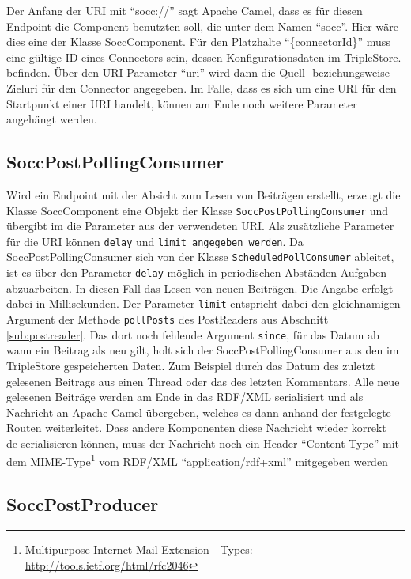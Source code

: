 Der Anfang der URI mit \enquote{socc://} sagt Apache Camel, dass es für diesen Endpoint die Component benutzten soll, die unter dem Namen \enquote{socc}. Hier wäre dies eine der Klasse SoccComponent. Für den Platzhalte \enquote{\{connectorId\}} muss eine gültige ID eines Connectors sein, dessen Konfigurationsdaten im TripleStore. befinden. Über den URI Parameter \enquote{uri} wird dann die Quell- beziehungsweise Zieluri für den Connector angegeben. Im Falle, dass es sich um eine URI für den Startpunkt einer URI handelt, können am Ende noch weitere Parameter angehängt werden.

\subsection{SoccPostPollingConsumer} %
\label{sub:soccpostpollingconsumer}

Wird ein Endpoint mit der Absicht zum Lesen von Beiträgen erstellt, erzeugt die Klasse SoccComponent eine Objekt der Klasse \texttt{SoccPostPollingConsumer} und übergibt im die Parameter aus der verwendeten URI. Als zusätzliche Parameter für die URI können \texttt{delay} und \texttt{limit angegeben werden}. Da SoccPostPollingConsumer sich von der Klasse \texttt{ScheduledPollConsumer} ableitet, ist es über den Parameter \texttt{delay} möglich in periodischen Abständen Aufgaben abzuarbeiten. In diesen Fall das Lesen von neuen Beiträgen. Die Angabe erfolgt dabei in Millisekunden. Der Parameter \texttt{limit} entspricht dabei den gleichnamigen Argument der Methode \texttt{pollPosts} des PostReaders aus Abschnitt \ref{sub:postreader}. Das dort noch fehlende Argument \texttt{since}, für das Datum ab wann ein Beitrag als neu gilt, holt sich der SoccPostPollingConsumer aus den im TripleStore gespeicherten Daten. Zum Beispiel durch das Datum des zuletzt gelesenen Beitrags aus einen Thread oder das des letzten Kommentars. Alle neue gelesenen Beiträge werden am Ende in das RDF/XML serialisiert und als Nachricht an Apache Camel übergeben, welches es dann anhand der festgelegte Routen weiterleitet. Dass andere Komponenten diese Nachricht wieder korrekt de-serialisieren können, muss der Nachricht noch ein Header \enquote{Content-Type} mit dem MIME-Type\footnote{ Multipurpose Internet Mail Extension - Types: \url{http://tools.ietf.org/html/rfc2046}} vom RDF/XML \enquote{application/rdf+xml} mitgegeben werden


\subsection{SoccPostProducer} %
\label{sub:soccpostproducer}

